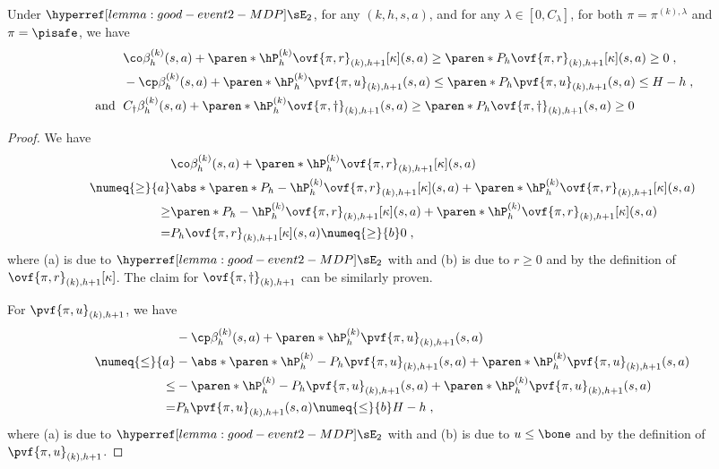 \begin{lemma}\label{lemma:no-clip}
Under $\confevent$, for any $(k, h, s, a)$, and for any $\lambda \in [0, C_\lambda]$, for both $\pi = \pi^{(k), \lambda}$ and $\pi=\pisafe$, we have 
\begin{align*}
&\co\beta^{(k)}_h(s, a) + \paren*{\hP^{(k)}_h \ovf{\pi, r}_{(k), h+1}[\kappa]}(s, a) \geq \paren*{P_h \ovf{\pi, r}_{(k), h+1}[\kappa]}(s, a) \geq 0\;,\\
&-\cp \beta^{(k)}_h(s, a) + \paren*{\hP^{(k)}_h \pvf{\pi, u}_{(k), h+1}}(s, a) \leq  \paren*{P_h \pvf{\pi, u}_{(k), h+1}}(s, a) \leq H-h\;,\\
\text{ and }\;
&C_\dagger\beta^{(k)}_h(s, a) + \paren*{\hP^{(k)}_h \ovf{\pi, \dagger}_{(k), h+1}}(s, a) \geq \paren*{P_h \ovf{\pi, \dagger}_{(k), h+1}}(s, a) \geq 0\\
\end{align*}
\end{lemma}
\begin{proof}
We have
\begin{align*}
&\co\beta^{(k)}_h(s, a) + \paren*{\hP^{(k)}_h \ovf{\pi, r}_{(k), h+1}[\kappa]}(s, a)\\
\numeq{\geq}{a} &\abs*{\paren*{P_h - \hP^{(k)}_h} \ovf{\pi, r}_{(k), h+1}[\kappa]}(s, a) + \paren*{\hP^{(k)}_h \ovf{\pi, r}_{(k), h+1}[\kappa]}(s, a)\\
\geq &\paren*{P_h - \hP^{(k)}_h} \ovf{\pi, r}_{(k), h+1}[\kappa](s, a) + \paren*{\hP^{(k)}_h \ovf{\pi, r}_{(k), h+1}[\kappa]}(s, a)\\
= &
P_h \ovf{\pi, r}_{(k), h+1}[\kappa](s, a) \numeq{\geq}{b} 0\;,
\end{align*}   
where (a) is due to $\confevent$ with  and (b) is due to $r \geq 0$ and by the definition of $\ovf{\pi, r}_{(k), h+1}[\kappa]$.
The claim for $\ovf{\pi, \dagger}_{(k), h+1}$ can be similarly proven.

For $\pvf{\pi, u}_{(k), h+1}$, we have
\begin{align*}
&-\cp \beta^{(k)}_h(s, a) + \paren*{\hP^{(k)}_h \pvf{\pi, u}_{(k), h+1}}(s, a)\\
\numeq{\leq}{a} &-\abs*{\paren*{\hP^{(k)}_h - P_h} \pvf{\pi, u}_{(k), h+1}}(s, a) + \paren*{\hP^{(k)}_h \pvf{\pi, u}_{(k), h+1}}(s, a)\\
\leq &-\paren*{\hP^{(k)}_h - P_h} \pvf{\pi, u}_{(k), h+1}(s, a) + \paren*{\hP^{(k)}_h \pvf{\pi, u}_{(k), h+1}}(s, a)\\
= &
P_h \pvf{\pi, u}_{(k), h+1}(s, a) \numeq{\leq}{b} H-h\;,
\end{align*}   
where (a) is due to $\confevent$ with  and (b) is due to $u \leq \bone$ and by the definition of $\pvf{\pi, u}_{(k), h+1}$.
\end{proof}

